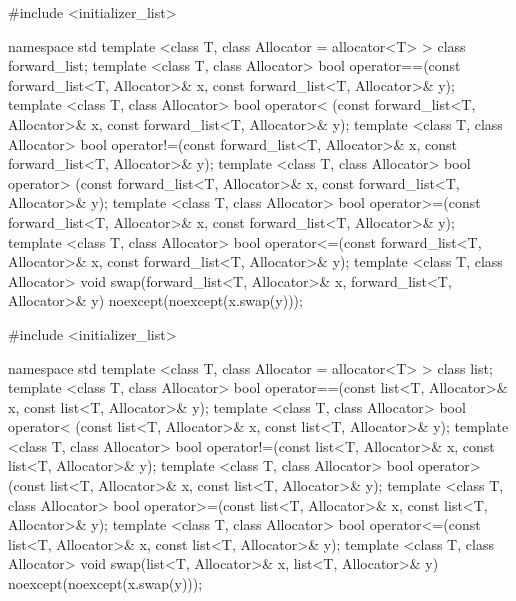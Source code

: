 %

\begin{codeblock}
#include <initializer_list>

namespace std {
  template <class T, class Allocator = allocator<T> > class forward_list;
  template <class T, class Allocator>
    bool operator==(const forward_list<T, Allocator>& x, const forward_list<T, Allocator>& y);
  template <class T, class Allocator>
    bool operator< (const forward_list<T, Allocator>& x, const forward_list<T, Allocator>& y);
  template <class T, class Allocator>
    bool operator!=(const forward_list<T, Allocator>& x, const forward_list<T, Allocator>& y);
  template <class T, class Allocator>
    bool operator> (const forward_list<T, Allocator>& x, const forward_list<T, Allocator>& y);
  template <class T, class Allocator>
    bool operator>=(const forward_list<T, Allocator>& x, const forward_list<T, Allocator>& y);
  template <class T, class Allocator>
    bool operator<=(const forward_list<T, Allocator>& x, const forward_list<T, Allocator>& y);
  template <class T, class Allocator>
    void swap(forward_list<T, Allocator>& x, forward_list<T, Allocator>& y)
      noexcept(noexcept(x.swap(y)));
}
\end{codeblock}

%

\begin{codeblock}
#include <initializer_list>

namespace std {
  template <class T, class Allocator = allocator<T> > class list;
  template <class T, class Allocator>
    bool operator==(const list<T, Allocator>& x, const list<T, Allocator>& y);
  template <class T, class Allocator>
    bool operator< (const list<T, Allocator>& x, const list<T, Allocator>& y);
  template <class T, class Allocator>
    bool operator!=(const list<T, Allocator>& x, const list<T, Allocator>& y);
  template <class T, class Allocator>
    bool operator> (const list<T, Allocator>& x, const list<T, Allocator>& y);
  template <class T, class Allocator>
    bool operator>=(const list<T, Allocator>& x, const list<T, Allocator>& y);
  template <class T, class Allocator>
    bool operator<=(const list<T, Allocator>& x, const list<T, Allocator>& y);
  template <class T, class Allocator>
    void swap(list<T, Allocator>& x, list<T, Allocator>& y)
      noexcept(noexcept(x.swap(y)));
}
\end{codeblock}

